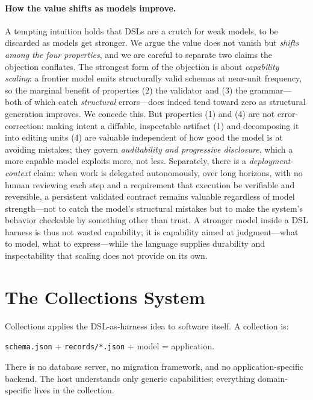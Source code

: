 \documentclass[11pt]{article}
\newcommand{\code}[1]{\texttt{\small #1}}
\begin{document}
\paragraph{How the value shifts as models improve.}
A tempting intuition holds that DSLs are a crutch for weak models, to be discarded
as models get stronger. We argue the value does not vanish but \emph{shifts among
the four properties}, and we are careful to separate two claims the objection
conflates. The strongest form of the objection is about \emph{capability scaling}:
a frontier model emits structurally valid schemas at near-unit frequency, so the
marginal benefit of properties (2) the validator and (3) the grammar---both of
which catch \emph{structural} errors---does indeed tend toward zero as structural
generation improves. We concede this. But properties (1) and (4) are not error-correction:
making intent a diffable, inspectable artifact (1) and decomposing it into editing
units (4) are valuable independent of how good the model is at avoiding mistakes;
they govern \emph{auditability and progressive disclosure}, which a more capable
model exploits more, not less. Separately, there is a \emph{deployment-context}
claim: when work is delegated autonomously, over long horizons, with no human
reviewing each step and a requirement that execution be verifiable and reversible,
a persistent validated contract remains valuable regardless of model strength---not
to catch the model's structural mistakes but to make the system's behavior
checkable by something other than trust. A stronger model inside a DSL harness is
thus not wasted capability; it is capability aimed at judgment---what to model,
what to express---while the language supplies durability and inspectability that
scaling does not provide on its own.

\section{The Collections System}
\label{sec:collections}

Collections applies the DSL-as-harness idea to software itself. A collection is:
\begin{center}
\code{schema.json} \;+\; \code{records/*.json} \;+\; model \;=\; application.
\end{center}
There is no database server, no migration framework, and no application-specific
backend. The host understands only generic capabilities; everything
domain-specific lives in the collection.
\end{document}
